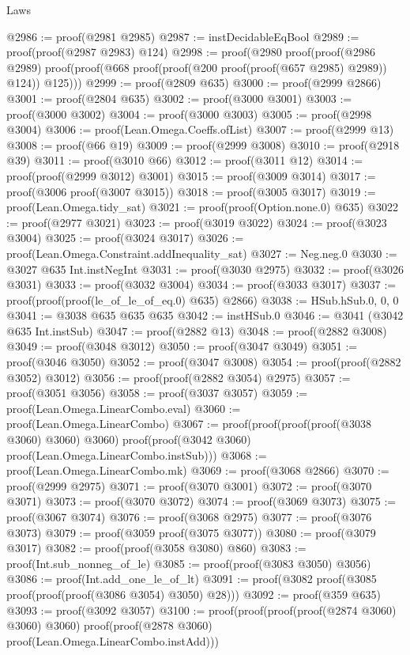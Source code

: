 \begin{lexlean}{Laws}
\begin{coremodule}
@2986 := proof(@2981 @2985)
@2987 := instDecidableEqBool
@2989 := proof(proof(@2987 @2983) @124)
@2998 := proof(@2980
      proof(proof(@2986 @2989)
          proof(proof(@668 proof(proof(@200 proof(proof(@657 @2985) @2989)) @124)) @125)))
@2999 := proof(@2809 @635)
@3000 := proof(@2999 @2866)
@3001 := proof(@2804 @635)
@3002 := proof(@3000 @3001)
@3003 := proof(@3000 @3002)
@3004 := proof(@3000 @3003)
@3005 := proof(@2998 @3004)
@3006 := proof(Lean.Omega.Coeffs.ofList)
@3007 := proof(@2999 @13)
@3008 := proof(@66 @19)
@3009 := proof(@2999 @3008)
@3010 := proof(@2918 @39)
@3011 := proof(@3010 @66)
@3012 := proof(@3011 @12)
@3014 := proof(proof(@2999 @3012) @3001)
@3015 := proof(@3009 @3014)
@3017 := proof(@3006 proof(@3007 @3015))
@3018 := proof(@3005 @3017)
@3019 := proof(Lean.Omega.tidy_sat)
@3021 := proof(proof(Option.none.{0}) @635)
@3022 := proof(@2977 @3021)
@3023 := proof(@3019 @3022)
@3024 := proof(@3023 @3004)
@3025 := proof(@3024 @3017)
@3026 := proof(Lean.Omega.Constraint.addInequality_sat)
@3027 := Neg.neg.{0}
@3030 := @3027 @635 Int.instNegInt
@3031 := proof(@3030 @2975)
@3032 := proof(@3026 @3031)
@3033 := proof(@3032 @3004)
@3034 := proof(@3033 @3017)
@3037 := proof(proof(proof(le_of_le_of_eq.{0}) @635) @2866)
@3038 := HSub.hSub.{0, 0, 0}
@3041 := @3038 @635 @635 @635
@3042 := instHSub.{0}
@3046 := @3041 (@3042 @635 Int.instSub)
@3047 := proof(@2882 @13)
@3048 := proof(@2882 @3008)
@3049 := proof(@3048 @3012)
@3050 := proof(@3047 @3049)
@3051 := proof(@3046 @3050)
@3052 := proof(@3047 @3008)
@3054 := proof(proof(@2882 @3052) @3012)
@3056 := proof(proof(@2882 @3054) @2975)
@3057 := proof(@3051 @3056)
@3058 := proof(@3037 @3057)
@3059 := proof(Lean.Omega.LinearCombo.eval)
@3060 := proof(Lean.Omega.LinearCombo)
@3067 := proof(proof(proof(proof(@3038 @3060) @3060) @3060)
      proof(proof(@3042 @3060) proof(Lean.Omega.LinearCombo.instSub)))
@3068 := proof(Lean.Omega.LinearCombo.mk)
@3069 := proof(@3068 @2866)
@3070 := proof(@2999 @2975)
@3071 := proof(@3070 @3001)
@3072 := proof(@3070 @3071)
@3073 := proof(@3070 @3072)
@3074 := proof(@3069 @3073)
@3075 := proof(@3067 @3074)
@3076 := proof(@3068 @2975)
@3077 := proof(@3076 @3073)
@3079 := proof(@3059 proof(@3075 @3077))
@3080 := proof(@3079 @3017)
@3082 := proof(proof(@3058 @3080) @860)
@3083 := proof(Int.sub_nonneg_of_le)
@3085 := proof(proof(@3083 @3050) @3056)
@3086 := proof(Int.add_one_le_of_lt)
@3091 := proof(@3082 proof(@3085 proof(proof(proof(@3086 @3054) @3050) @28)))
@3092 := proof(@359 @635)
@3093 := proof(@3092 @3057)
@3100 := proof(proof(proof(proof(@2874 @3060) @3060) @3060)
      proof(proof(@2878 @3060) proof(Lean.Omega.LinearCombo.instAdd)))

\end{coremodule}
\end{lexlean}
